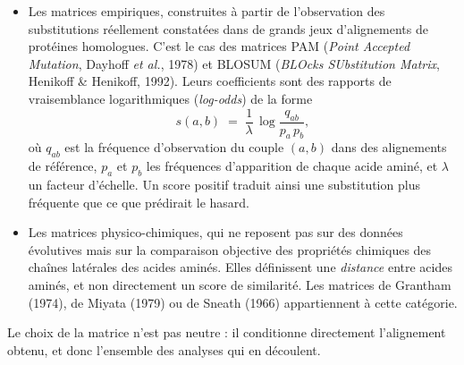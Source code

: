 \documentclass[11pt,a4paper]{article}
\begin{document}
\begin{itemize}
    \item Les matrices empiriques, construites à partir de
    l'observation des substitutions réellement constatées dans de grands jeux d'alignements
    de protéines homologues. C'est le cas des matrices PAM (\emph{Point Accepted Mutation},
    Dayhoff \emph{et al.}, 1978) et BLOSUM (\emph{BLOcks SUbstitution Matrix}, Henikoff \&
    Henikoff, 1992). Leurs coefficients sont des rapports de vraisemblance logarithmiques
    (\emph{log-odds}) de la forme
    \[
        s(a,b) \;=\; \frac{1}{\lambda} \, \log \frac{q_{ab}}{p_a \, p_b},
    \]
    où $q_{ab}$ est la fréquence d'observation du couple $(a,b)$ dans des alignements de
    référence, $p_a$ et $p_b$ les fréquences d'apparition de chaque acide aminé, et
    $\lambda$ un facteur d'échelle. Un score positif traduit ainsi une substitution plus
    fréquente que ce que prédirait le hasard.

    \vspace{1cm}

    \item Les matrices physico-chimiques, qui ne reposent pas sur des données
    évolutives mais sur la comparaison objective des propriétés chimiques des chaînes
    latérales des acides aminés. Elles définissent une \emph{distance} entre acides aminés,
    et non directement un score de similarité. Les matrices de Grantham (1974), de Miyata
    (1979) ou de Sneath (1966) appartiennent à cette catégorie.
\end{itemize}

\vspace{0.5cm}
Le choix de la matrice n'est pas neutre : il conditionne directement l'alignement obtenu,
et donc l'ensemble des analyses qui en découlent.


\vspace{1cm}
\end{document}
